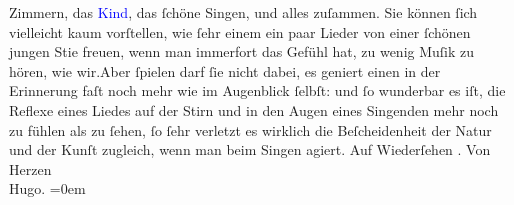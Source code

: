                     Zimmern, das \textcolor{blue}{Kind}{}, das
                    ſchöne Singen, und alles zuſammen. Sie können ſich vielleicht kaum vorſtellen,
                    wie ſehr einem ein paar Lieder von einer ſchönen jungen Sti{\geminationm}e freuen, wenn {\pb}man immerfort das Gefühl
                    hat, zu wenig Muſik zu hören, wie wir.\hspace*{1.5em}Aber
                    ſpielen darf ſie nicht dabei, es geniert einen in der Erinnerung faſt noch mehr
                    wie im Augenblick ſelbſt: und ſo wunderbar es iſt, die Reflexe eines Liedes auf
                    der Stirn und in den Augen eines Singenden mehr noch zu fühlen als zu ſehen, ſo
                    ſehr {\pb}verletzt es wirklich
                    die Beſcheidenheit der Natur und der Kunſt zugleich, wenn man beim Singen
                    agiert.\pend
           \pstart
           Auf Wiederſehen \label{K_L01319_2v}\label{K_L01319_2h}.\pend
           \pstart
           Von Herzen{\\[\baselineskip]}\spacefill\mbox{Hugo.}\pend
           \leftskip=0em{}\endnumbering{}  
      